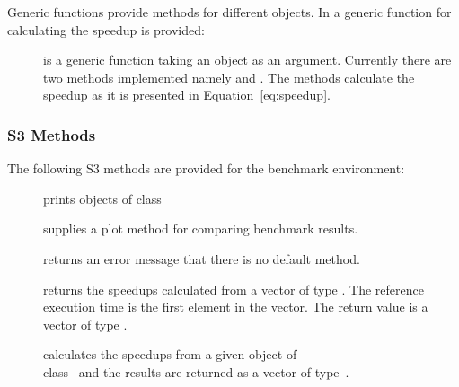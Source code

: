 Generic functions provide methods for different objects. In 
a generic function for calculating the speedup is provided:

\begin{description}
\item[] is a generic function taking an object as
  an argument. Currently there are two methods implemented namely
   and . The methods
  calculate the speedup as it is presented in
  Equation~\ref{eq:speedup}.
\end{description}

\subsubsection{S3 Methods}

The following S3 methods are provided for the benchmark environment:

\begin{description}
\item[] prints objects of class 
\item[] supplies a plot method for comparing
  benchmark results.
\item[] returns an error message that there is
  no default method. 
\item[] returns the speedups calculated from a
  vector of type . The reference execution time is  the
  first element in the vector. The return value is a vector of type
  . 
\item[] calculates the speedups from a given
  object of \\class~ and the results are
  returned as a vector of 
  type~. 
\end{description}

